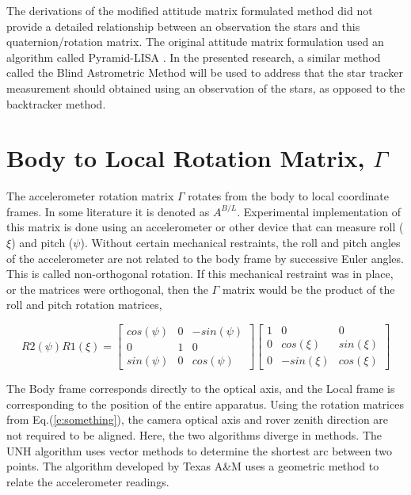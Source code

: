 \documentclass[12pt,a4paper]{book}
\begin{document}
The derivations of the modified attitude matrix formulated method did not provide a detailed relationship between an observation the stars and this quaternion/rotation matrix.  The original attitude matrix formulation used an algorithm called Pyramid-LISA \cite{b:pyramid}.  In the presented research, a similar method called the Blind Astrometric Method will be used to address that the star tracker measurement should obtained using an observation of the stars, as opposed to the backtracker method.

\section{Body to Local Rotation Matrix, $\Gamma$}
The accelerometer rotation matrix $\Gamma$ rotates from the body to local coordinate frames.  In some literature it is denoted as $A^{B/L}$.  Experimental implementation of this matrix is done using an accelerometer or other device that can measure roll ($\xi$) and pitch ($\psi$). Without certain mechanical restraints, the roll and pitch angles of the accelerometer are not related to the body frame by successive Euler angles. This is called non-orthogonal rotation. If this mechanical restraint was in place, or the matrices were orthogonal, then the $\Gamma$ matrix would be the product of the roll and pitch rotation matrices,

\begin{equation}
R2(\psi)R1(\xi) = 
\begin{bmatrix}
cos(\psi) & 0 & -sin(\psi)\\
0 & 1 & 0\\
sin(\psi) & 0 & cos(\psi)
\end{bmatrix}
\begin{bmatrix}
1 & 0 & 0\\
0 & cos(\xi) & sin(\xi)\\
0 & -sin(\xi) & cos(\xi)
\end{bmatrix}
\label{e:something}
\end{equation}

The Body frame corresponds directly to the optical axis, and the Local frame is corresponding to the position of the entire apparatus.  Using the rotation matrices from Eq.(\ref{e:something}), the camera optical axis and rover zenith direction are not required to be aligned.  Here, the two algorithms diverge in methods.  The UNH algorithm uses vector methods to determine the shortest arc between two points.  The algorithm developed by Texas A\&M uses a geometric method to relate the accelerometer readings.  
\end{document}
